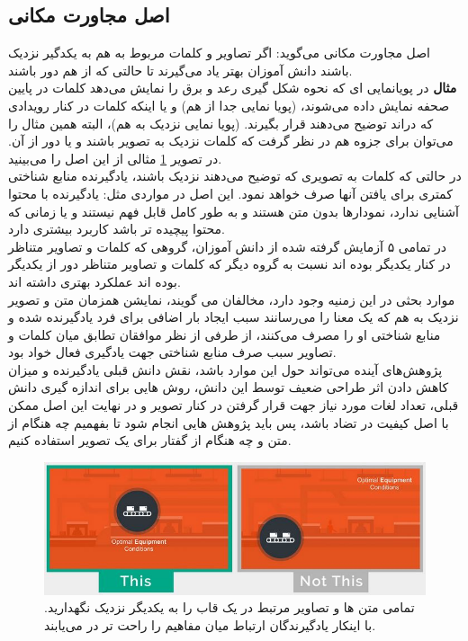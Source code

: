 \subsection{اصل مجاورت مکانی}
اصل مجاورت مکانی
می‌گوید: اگر تصاویر و کلمات مربوط به هم به یکدگیر نزدیک باشند دانش آموزان بهتر یاد می‌گیرند تا حالتی که از هم دور باشند.
\\
\textbf{مثال}
در پویانمایی ای که نحوه شکل گیری رعد و برق را نمایش می‌دهد کلمات در پایین صحفه نمایش داده می‌شوند، (پویا نمایی جدا از هم) و یا اینکه کلمات در کنار رویدادی که دراند توضیح می‌دهند قرار بگیرند. (پویا نمایی نزدیک به هم)، البته همین مثال را می‌توان برای جزوه هم در نظر گرفت که کلمات نزدیک به تصویر باشند و یا دور از آن. در تصویر
\ref{fig:spatialexample}
مثالی از این اصل را می‌بینید.
\\
در حالتی که کلمات به تصویری که توضیح می‌دهند نزدیک باشند، یادگیرنده منابع شناختی کمتری برای یافتن آنها صرف خواهد نمود.  این اصل در مواردی مثل: یادگیرنده با محتوا آشنایی ندارد، نمودارها بدون متن هستند و به طور کامل قابل فهم نیستند و یا زمانی که محتوا پیچیده تر باشد کاربرد بیشتری دارد. 
\\
در تمامی ۵ آزمایش گرفته شده از دانش آموزان، گروهی که کلمات و تصاویر متناظر در کنار یکدیگر بوده اند نسبت به گروه دیگر که کلمات و تصاویر متناظر دور از یکدیگر بوده اند عملکرد بهتری داشته اند.
\\
موارد بحثی در این زمنیه وجود دارد، مخالفان می گویند، نمایشن همزمان متن و تصویر نزدیک به هم که یک معنا را می‌رسانند سبب ایجاد بار اضافی برای فرد یادگیرنده شده و منابع شناختی او را مصرف می‌کنند، از طرفی از نظر موافقان تطابق میان کلمات و تصاویر سبب صرف منابع شناختی جهت یادگیری فعال خواد بود.
\\
پژوهش‌های آینده می‌تواند حول این موارد باشد، نقش دانش قبلی یادگیرنده و میزان کاهش دادن اثر طراحی ضعیف توسط این دانش، روش هایی برای اندازه گیری دانش قبلی، تعداد لغات مورد نیاز جهت قرار گرفتن در کنار تصویر و در نهایت این اصل ممکن با اصل کیفیت در تضاد باشد، پس باید پژوهش هایی انجام شود تا بفهمیم چه هنگام از متن و چه هنگام از گفتار برای یک تصویر استفاده کنیم.
\begin{figure}[htbp]
	\centering
	\includegraphics[width=0.7\linewidth]{figures/spatial_example}
	\caption[مثال اصل مجاورت مکانی]{تمامی متن ها و تصاویر مرتبط در یک قاب را به یکدیگر نزدیک نگهدارید. با اینکار یادگیرندگان ارتباط میان مفاهیم را راحت تر در می‌یابند.}
	\label{fig:spatialexample}
\end{figure}

